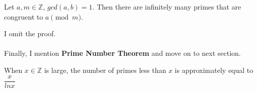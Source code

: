 \begin{theorem}
Let $a, m\in \mathbb{Z}$, $gcd(a, b) = 1$. Then there are infinitely many primes that are congruent to $a \pmod{m}$.
\end{theorem}

\noindent
I omit the proof. \\
\\
Finally, I mention \textbf{Prime Number Theorem} and move on to next section.

\begin{theorem}
When $x\in \mathbb{Z}$ is large, the number of primes less than $x$ is approximately equal to $\dfrac{x}{ln{x}}$
\end{theorem}